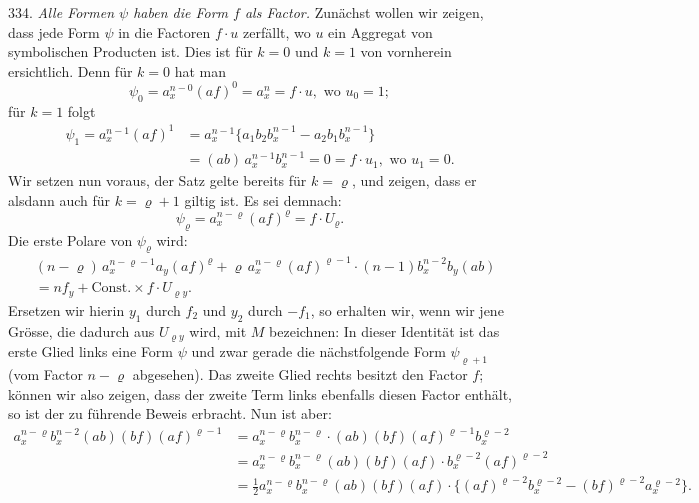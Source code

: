 334. \textit{Alle Formen $\psi$ haben die Form $f$ als Factor.} Zunächst wollen wir zeigen, dass jede Form $\psi$ in die Factoren $f \cdot u$ zerfällt, wo $u$ ein Aggregat von symbolischen Producten ist. Dies ist für $k = 0$ und $k = 1$ von vornherein ersichtlich. Denn für $k = 0$ hat man
\[
\psi_0 = a_x^{n-0}(af)^0 = a_x^n = f \cdot u, \text{ wo } u_0 = 1;
\]
für $k = 1$ folgt
\[
\begin{aligned}
\psi_1 = a_x^{n-1}(af)^1 &= a_x^{n-1}\{a_1b_2b_x^{n-1} - a_2b_1b_x^{n-1}\} \\
&= (ab)\,a_x^{n-1}b_x^{n-1} = 0 = f \cdot u_1, \text{ wo } u_1 = 0.
\end{aligned}
\]
Wir setzen nun voraus, der Satz gelte bereits für $k = \varrho$, und zeigen, dass er alsdann auch für $k = \varrho + 1$ giltig ist. Es sei demnach:
\[
\psi_\varrho = a_x^{n-\varrho}(af)^\varrho = f \cdot U_\varrho.
\]
Die erste Polare von $\psi_\varrho$ wird:
\[
\begin{aligned}
&(n - \varrho)\,a_x^{n-\varrho-1}a_y(af)^\varrho + \varrho\,a_x^{n-\varrho}(af)^{\varrho-1}\cdot(n-1)b_x^{n-2}b_y(ab) \\
&= nf_y + \mathrm{Const.}\times f\cdot U_{\varrho y}.
\end{aligned}
\]
Ersetzen wir hierin $y_1$ durch $f_2$ und $y_2$ durch $-f_1$, so erhalten wir, wenn wir jene Grösse, die dadurch aus $U_{\varrho y}$ wird, mit $M$ bezeichnen:
In dieser Identität ist das erste Glied links eine Form $\psi$ und zwar gerade die nächstfolgende Form $\psi_{\varrho+1}$ (vom Factor $n - \varrho$ abgesehen). Das zweite Glied rechts besitzt den Factor $f$; können wir also zeigen, dass der zweite Term links ebenfalls diesen Factor enthält, so ist der zu führende Beweis erbracht. Nun ist aber:
\[
\begin{aligned}
a_x^{n-\varrho}b_x^{n-2}(ab)(bf)(af)^{\varrho-1} &= a_x^{n-\varrho}b_x^{n-\varrho}\cdot(ab)(bf)(af)^{\varrho-1}b_x^{\varrho-2} \\
&= a_x^{n-\varrho}b_x^{n-\varrho}(ab)(bf)(af)\cdot b_x^{\varrho-2}(af)^{\varrho-2} \\
&= \frac{1}{2}a_x^{n-\varrho}b_x^{n-\varrho}(ab)(bf)(af)\cdot\{(af)^{\varrho-2}b_x^{\varrho-2} - (bf)^{\varrho-2}a_x^{\varrho-2}\}.
\end{aligned}
\]


